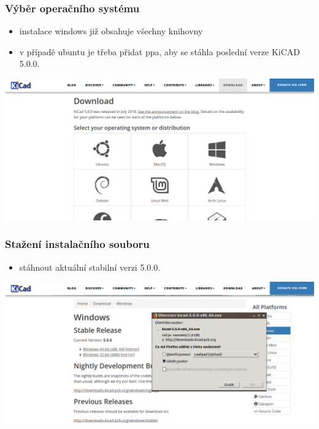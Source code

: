 \documentclass{beamer}
\newcommand{\kicadVersion}{5.0.0.}
\begin{document}
	\begin{frame}
    \frametitle{Výběr operačního systému}
		\small
		\begin{itemize}
			\item instalace windows již obsahuje všechny knihovny
			\item v případě ubuntu je třeba přidat ppa, aby se stáhla poslední verze KiCAD \kicadVersion\
		\end{itemize}
		
		\begin{center}
			\includegraphics[scale=0.3]{obr/kicad_dwnld.png}
		\end{center}
	\end{frame}
	\begin{frame}
    \frametitle{Stažení instalačního souboru}
		\small
		\begin{itemize}
			\item stáhnout aktuální stabilní verzi \kicadVersion\
		\end{itemize}
		
		\begin{center}
			\includegraphics[scale=0.3]{obr/kicad_stbv.png}
		\end{center}
	\end{frame}
\end{document}
